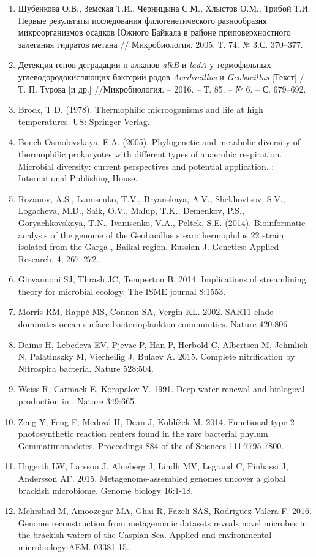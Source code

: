 \documentclass[a4paper,12pt,openany,final]{extreport}
\begin{document}
\begin{enumerate}
\def\labelenumi{\arabic{enumi}.}
\item
  Шубенкова О.В., Земская Т.И., Черницына С.М., Хлыстов О.М., Трибой
  Т.И. Первые результаты исследования филогенетического разнообразия
  микроорганизмов осадков Южного Байкала в районе приповерхностного
  залегания гидратов метана // Микробиология. 2005. Т. 74. № 3.С.
  370--377.
\item
  Детекция генов деградации н-алканов \emph{alkB} и \emph{ladA} у
  термофильных углеводородокисляющих бактерий родов \emph{Aeribacillus}
  и \emph{Geobacillus} {[}Текст{]} / Т. П. Турова {[}и др.{]}
  //Микробиология. -- 2016. -- Т. 85. -- № 6. -- С. 679--692.
\item
  Brock, T.D. (1978). Thermophilic microoganisms and life at high
  temperatures. US: Springer-Verlag.
\item
  Bonch-Osmolovskaya, E.A. (2005). Phylogenetic and metabolic diversity
  of thermophilic prokaryotes with different types of anaerobic
  respiration. Microbial diversity: current perspectives and potential
  application. : International Publishing House.
\item
  Rozanov, A.S., Ivanisenko, T.V., Bryanskaya, A.V., Shekhovtsov, S.V.,
  Logacheva, M.D., Saik, O.V., Malup, T.K., Demenkov, P.S.,
  Goryachkovskaya, T.N., Ivanisenko, V.A., Peltek, S.E. (2014).
  Bioinformatic analysis of the genome of the Geobacillus
  stearothermophilus 22 strain isolated from the Garga , Baikal region.
  Russian J. Genetics: Applied Research, 4, 267--272.
\item
  Giovannoni SJ, Thrash JC, Temperton B. 2014. Implications of
  streamlining theory for microbial ecology. The ISME journal 8:1553.
\item
  Morris RM, Rappé MS, Connon SA, Vergin KL. 2002. SAR11 clade dominates
  ocean surface bacterioplankton communities. Nature 420:806
\item
  Daims H, Lebedeva EV, Pjevac P, Han P, Herbold C, Albertsen M,
  Jehmlich N, Palatinszky M, Vierheilig J, Bulaev A. 2015. Complete
  nitrification by Nitrospira bacteria. Nature 528:504.
\item
  Weiss R, Carmack E, Koropalov V. 1991. Deep-water renewal and
  biological production in . Nature 349:665.
\item
  Zeng Y, Feng F, Medová H, Dean J, Koblížek M. 2014. Functional type 2
  photosynthetic reaction centers found in the rare bacterial phylum
  Gemmatimonadetes. Proceedings 884 of the of Sciences 111:7795-7800.
\item
  Hugerth LW, Larsson J, Alneberg J, Lindh MV, Legrand C, Pinhassi J,
  Andersson AF. 2015. Metagenome-assembled genomes uncover a global
  brackish microbiome. Genome biology 16:1-18.
\item
  Mehrshad M, Amoozegar MA, Ghai R, Fazeli SAS, Rodriguez-Valera F.
  2016. Genome reconstruction from metagenomic datasets reveals novel
  microbes in the brackish waters of the Caspian Sea. Applied and
  environmental microbiology:AEM. 03381-15.
\end{enumerate}
\end{document}
